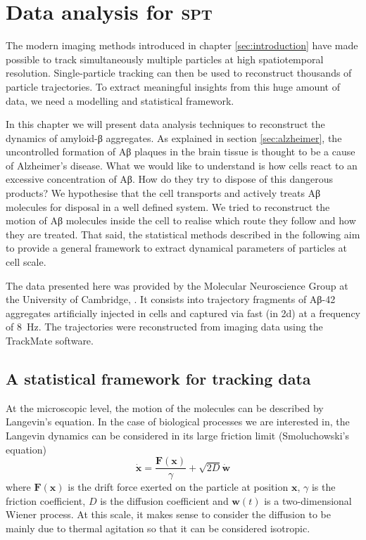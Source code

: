
\chapter{Data analysis for \textsc{spt}}\label{sec:data_analysis}


The modern imaging methods introduced in chapter \ref{sec:introduction} have made possible to track simultaneously multiple particles at high spatiotemporal resolution. Single-particle tracking can then be used to reconstruct thousands of particle trajectories. To extract meaningful insights from this huge amount of data, we need a modelling and statistical framework.

In this chapter we will present data analysis techniques to reconstruct the dynamics of amyloid-β aggregates. As explained in section \ref{sec:alzheimer}, the uncontrolled formation of Aβ plaques in the brain tissue is thought to be a cause of Alzheimer's disease. What we would like to understand is how cells react to an excessive concentration of Aβ. How do they try to dispose of this dangerous products? We hypothesise that the cell transports and actively treats Aβ molecules for disposal in a well defined system. We tried to reconstruct the motion of Aβ molecules inside the cell to realise which route they follow and how they are treated. That said, the statistical methods described in the following aim to provide a general framework to extract dynamical parameters of particles at cell scale.

The data presented here was provided by the Molecular Neuroscience Group at the University of Cambridge, . It consists into trajectory fragments of Aβ-42 aggregates artificially injected in  cells and captured via fast  (in 2d) at a frequency of \SI{8}{\hertz}. The trajectories were reconstructed from imaging data using the TrackMate software.

\section{A statistical framework for tracking data}

At the microscopic level, the motion of the molecules can be described by Langevin's equation. In the case of biological processes we are interested in, the Langevin dynamics can be considered in its large friction limit (Smoluchowski's equation)
\begin{equation} \label{eq:smoluchowski}
 \dot{\bm{x}} = \frac{\bm{F}(\bm{x})}{\gamma} + \sqrt{2D} \dot{\bm{w}}
\end{equation}
where $\bm{F}(\bm{x})$ is the drift force exerted on the particle at position $\bm{x}$, $\gamma$ is the friction coefficient, $D$ is the diffusion coefficient and $\bm{w}(t)$ is a two-dimensional Wiener process. At this scale, it makes sense to consider the diffusion to be mainly due to thermal agitation so that it can be considered isotropic.


